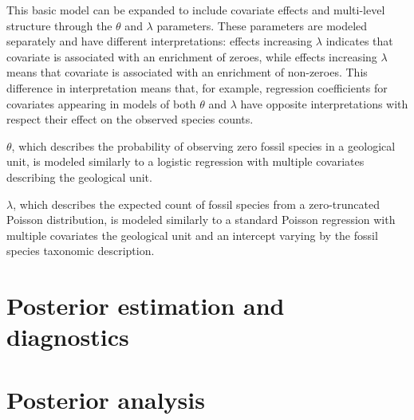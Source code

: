 \documentclass[12pt,letterpaper]{article}
\begin{document}
This basic model can be expanded to include covariate effects and multi-level structure through the \(\theta\) and \(\lambda\) parameters. These parameters are modeled separately and have different interpretations: effects increasing \(\lambda\) indicates that covariate is associated with an enrichment of zeroes, while effects increasing \(\lambda\) means that covariate is associated with an enrichment of non-zeroes. This difference in interpretation means that, for example, regression coefficients for covariates appearing in models of both \(\theta\) and \(\lambda\) have opposite interpretations with respect their effect on the observed species counts.


\(\theta\), which describes the probability of observing zero fossil species in a geological unit, is modeled similarly to a logistic regression with multiple covariates describing the geological unit.

\(\lambda\), which describes the expected count of fossil species from a zero-truncated Poisson distribution, is modeled similarly to a standard Poisson regression with multiple covariates the geological unit and an intercept varying by the fossil species taxonomic description.


\section{Posterior estimation and diagnostics}


\section{Posterior analysis}
\end{document}
